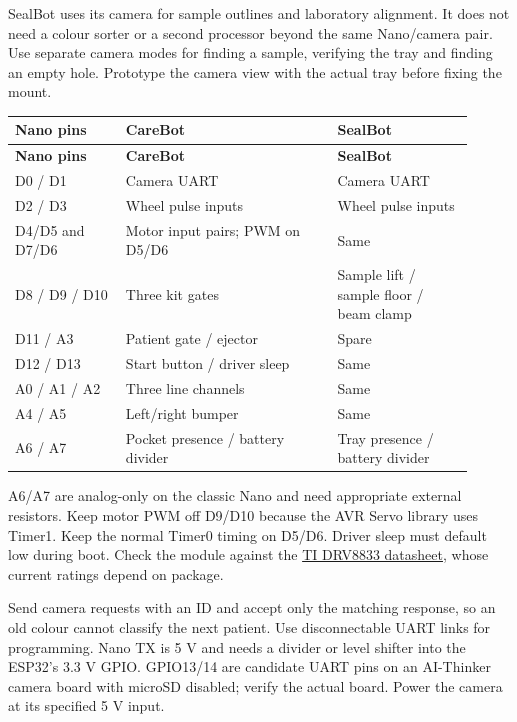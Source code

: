 \documentclass[10pt,a4paper]{article}
\begin{document}
SealBot uses its camera for sample outlines and laboratory alignment. It does not need a colour sorter or a second processor beyond the same Nano/camera pair. Use separate camera modes for finding a sample, verifying the tray and finding an empty hole. Prototype the camera view with the actual tray before fixing the mount.

\small\begin{longtable}{@{}>{\raggedright\arraybackslash}p{0.22\linewidth}>{\raggedright\arraybackslash}p{0.42\linewidth}>{\raggedright\arraybackslash}p{0.27\linewidth}@{}}
\toprule
\textbf{Nano pins} & \textbf{CareBot} & \textbf{SealBot} \\
\midrule\endfirsthead
\toprule\textbf{Nano pins} & \textbf{CareBot} & \textbf{SealBot} \\\midrule\endhead
D0 / D1 & Camera UART & Camera UART \\[3pt]
D2 / D3 & Wheel pulse inputs & Wheel pulse inputs \\[3pt]
D4/D5 and D7/D6 & Motor input pairs; PWM on D5/D6 & Same \\[3pt]
D8 / D9 / D10 & Three kit gates & Sample lift / sample floor / beam clamp \\[3pt]
D11 / A3 & Patient gate / ejector & Spare \\[3pt]
D12 / D13 & Start button / driver sleep & Same \\[3pt]
A0 / A1 / A2 & Three line channels & Same \\[3pt]
A4 / A5 & Left/right bumper & Same \\[3pt]
A6 / A7 & Pocket presence / battery divider & Tray presence / battery divider \\[3pt]
\bottomrule\end{longtable}\normalsize
A6/A7 are analog-only on the classic Nano and need appropriate external resistors. Keep motor PWM off D9/D10 because the AVR Servo library uses Timer1. Keep the normal Timer0 timing on D5/D6. Driver sleep must default low during boot. Check the module against the \href{https://www.ti.com/lit/ds/symlink/drv8833.pdf}{TI DRV8833 datasheet}, whose current ratings depend on package.

Send camera requests with an ID and accept only the matching response, so an old colour cannot classify the next patient. Use disconnectable UART links for programming. Nano TX is 5 V and needs a divider or level shifter into the ESP32's 3.3 V GPIO. GPIO13/14 are candidate UART pins on an AI-Thinker camera board with microSD disabled; verify the actual board. Power the camera at its specified 5 V input.
\end{document}
